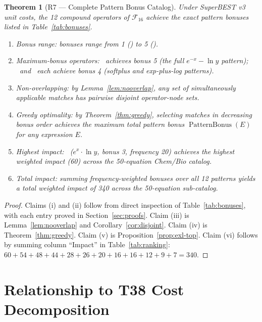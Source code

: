 \documentclass[12pt,a4paper]{article}
\newtheorem{theorem}{Theorem}[section]
\theoremstyle{definition}
\newcommand{\EXL}{\operatorname{EXL}}
\newcommand{\EAL}{\operatorname{EAL}}
\newcommand{\DEML}{\operatorname{DEML}}
\newcommand{\ELSb}{\operatorname{ELSb}}
\newcommand{\LEAd}{\operatorname{LEAd}}
\newcommand{\PB}{\operatorname{PatternBonus}}
\begin{document}
\begin{theorem}[R7 --- Complete Pattern Bonus Catalog]
\label{thm:R7}
Under SuperBEST v3 unit costs, the 12 compound operators of
$\mathcal{F}_{16}$ achieve the exact pattern bonuses listed in
Table~\ref{tab:bonuses}.
\begin{enumerate}[label=(\roman*)]
  \item \emph{Bonus range}: bonuses range from 1 (\ELSb) to 5 (\DEML).

  \item \emph{Maximum-bonus operators}: \DEML\ achieves bonus 5
        (the full $e^{-x} - \ln y$ pattern); \LEAd\ and \EAL\ each
        achieve bonus 4 (softplus and exp-plus-log patterns).

  \item \emph{Non-overlapping}:
        by Lemma~\ref{lem:nooverlap}, any set of simultaneously
        applicable matches has pairwise disjoint operator-node sets.

  \item \emph{Greedy optimality}:
        by Theorem~\ref{thm:greedy}, selecting matches in decreasing
        bonus order achieves the maximum total pattern bonus $\PB(E)$
        for any expression $E$.

  \item \emph{Highest impact}: \EXL\ ($e^x \cdot \ln y$, bonus 3,
        frequency 20) achieves the highest weighted impact (60) across
        the 50-equation Chem/Bio catalog.

  \item \emph{Total impact}: summing frequency-weighted bonuses over
        all 12 patterns yields a total weighted impact of 340 across
        the 50-equation sub-catalog.
\end{enumerate}
\end{theorem}

\begin{proof}
Claims (i) and (ii) follow from direct inspection of
Table~\ref{tab:bonuses}, with each entry proved in
Section~\ref{sec:proofs}.
Claim (iii) is Lemma~\ref{lem:nooverlap} and
Corollary~\ref{cor:disjoint}.
Claim (iv) is Theorem~\ref{thm:greedy}.
Claim (v) is Proposition~\ref{prop:exl-top}.
Claim (vi) follows by summing column ``Impact'' in
Table~\ref{tab:ranking}: $60+54+48+44+28+26+20+16+16+12+9+7 = 340$.
\end{proof}

\section{Relationship to T38 Cost Decomposition}
\label{sec:T38}
\end{document}
